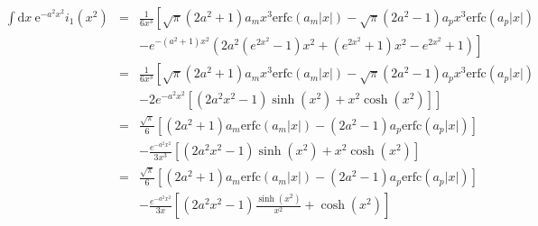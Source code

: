 \documentclass[paper=a4, fontsize=11pt]{article} %
\numberwithin{equation}{section} %
\numberwithin{figure}{section} %
\numberwithin{table}{section} %
\newcommand{\re}{{\mathrm{e}}}
\newcommand{\rerfc}{{\mathrm{erfc}}}
\newcommand{\rd}{{\mathrm{d}}}
\begin{document}
\begin{eqnarray}
\int \rd x\ \re^{-a^2x^2}i_{1}(x^2)&=& \frac{1}{6x^3} 
\left [
    \sqrt{\pi} (2 a^2 + 1)a_m x^3 \rerfc(a_m |x|)  - \sqrt{\pi} (2 a^2 - 1)a_p x^3 \rerfc(a_p|x|)
\right. \nonumber \\
& &  \left.  - e^{-(a^2+1) x^2} (2 a^2 (e^{2 x^2} - 1) x^2 + (e^{2 x^2} + 1) x^2 - e^{2 x^2} + 1) 
    \right ] \nonumber \\
&=& \frac{1}{6x^3} 
\left [
    \sqrt{\pi} (2 a^2 + 1)a_m x^3 \rerfc(a_m |x|)  - \sqrt{\pi} (2 a^2 - 1)a_p x^3 \rerfc(a_p|x|)
\right. \nonumber \\
& &  \left.  -2e^{-a^2x^2} \left [ (2a^2x^2-1)\sinh(x^2) + x^2\cosh(x^2)\right ]
    \right ] \nonumber \\
&=& \frac{\sqrt{\pi}}{6}\left [ (2 a^2 + 1)a_m \rerfc(a_m |x|)  - (2 a^2 - 1)a_p \rerfc(a_p|x|) \right ]
\nonumber \\
& &  -\frac{e^{-a^2x^2}}{3x^3}\left [ (2a^2x^2-1)\sinh(x^2) + x^2\cosh(x^2)\right ] \nonumber \\
&=& \frac{\sqrt{\pi}}{6}\left [ (2 a^2 + 1)a_m \rerfc(a_m |x|)  - (2 a^2 - 1)a_p \rerfc(a_p|x|) 
   \right ] \nonumber \\
& &  -\frac{e^{-a^2x^2}}{3x}\left [ (2a^2x^2-1)\frac{\sinh(x^2)}{x^2} + \cosh(x^2)\right ]
\end{eqnarray}
\end{document}
